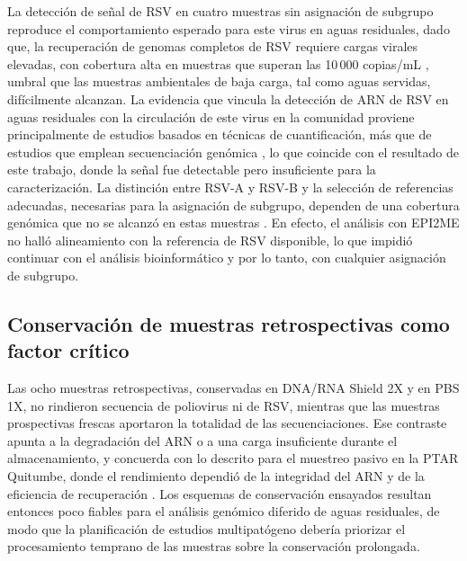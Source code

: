 La detección de señal de RSV en cuatro muestras sin asignación de subgrupo reproduce el comportamiento esperado para este virus en aguas residuales, dado que, la recuperación de genomas completos de RSV requiere cargas virales elevadas, con cobertura alta en muestras que superan las 10\,000 copias/mL \cite{Le_2025}, umbral que las muestras ambientales de baja carga, tal como aguas servidas, difícilmente alcanzan. La evidencia que vincula la detección de ARN de RSV en aguas residuales con la circulación de este virus en la comunidad proviene principalmente de estudios basados en técnicas de cuantificación, más que de estudios que emplean secuenciación genómica \cite{Hughes_2022}, lo que coincide con el resultado de este trabajo, donde la señal fue detectable pero insuficiente para la caracterización. La distinción entre RSV-A y RSV-B y la selección de referencias adecuadas, necesarias para la asignación de subgrupo, dependen de una cobertura genómica que no se alcanzó en estas muestras \cite{Le_2025}. En efecto, el análisis con EPI2ME no halló alineamiento con la referencia de RSV disponible, lo que impidió continuar con el análisis bioinformático y por lo tanto, con cualquier asignación de subgrupo.

\subsection{Conservación de muestras retrospectivas como factor crítico}

Las ocho muestras retrospectivas, conservadas en DNA/RNA Shield 2X y en PBS 1X, no rindieron secuencia de poliovirus ni de RSV, mientras que las muestras prospectivas frescas aportaron la totalidad de las secuenciaciones. Ese contraste apunta a la degradación del ARN o a una carga insuficiente durante el almacenamiento, y concuerda con lo descrito para el muestreo pasivo en la PTAR Quitumbe, donde el rendimiento dependió de la integridad del ARN y de la eficiencia de recuperación \cite{MejiaCalle_2024}. Los esquemas de conservación ensayados resultan entonces poco fiables para el análisis genómico diferido de aguas residuales, de modo que la planificación de estudios multipatógeno debería priorizar el procesamiento temprano de las muestras sobre la conservación prolongada.


